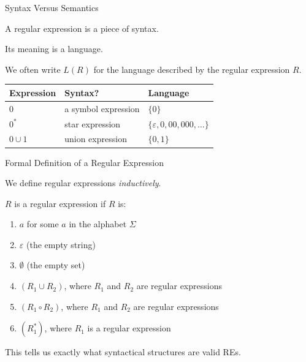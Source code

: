 \documentclass[10pt,aspectratio=169]{beamer}
\newcommand{\eps}{\varepsilon}
\begin{document}
\begin{frame}{Syntax Versus Semantics}

A regular expression is a piece of syntax.

\vspace{0.8em}
Its meaning is a language.

\vspace{0.8em}
We often write $L(R)$ for the language described by the regular expression $R$.

\vspace{0.8em}
\begin{table}
\centering
\begin{tabular}{lll}
\toprule
\textbf{Expression} & \textbf{Syntax?} & \textbf{Language} \\
\midrule
$0$ & a symbol expression & $\{0\}$ \\
$0^*$ & star expression & $\{\eps,0,00,000,\dots\}$ \\
$0\cup 1$ & union expression & $\{0,1\}$ \\
\bottomrule
\end{tabular}
\end{table}

\end{frame}

\begin{frame}{Formal Definition of a Regular Expression}

We define regular expressions \textit{inductively}. 

\vspace{0.5em}
$R$ is a regular expression if $R$ is:

\begin{enumerate}
    \item $a$ for some $a$ in the alphabet $\Sigma$
    \item $\eps$ (the empty string)
    \item $\emptyset$ (the empty set)
    \item $(R_1 \cup R_2)$, where $R_1$ and $R_2$ are regular expressions
    \item $(R_1 \circ R_2)$, where $R_1$ and $R_2$ are regular expressions
    \item $(R_1^*)$, where $R_1$ is a regular expression
\end{enumerate}

\vspace{0.5em}
This tells us exactly what syntactical structures are valid REs.

\end{frame}
\end{document}
